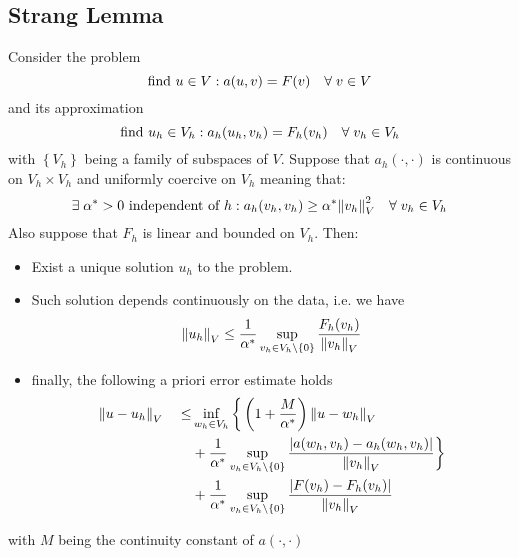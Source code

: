 \subsection{Strang Lemma}
\begin{lemma}
Consider the problem
\begin{equation}
    \text{find } u \in V: a(u,v) = F(v) \quad \forall \; v \in V
    \label{another_weak_formulation}
\end{equation}
and its approximation 
\begin{equation}
    \text{find } u_h \in V_h: a_h(u_h,v_h) = F_h(v_h) \quad \forall \; v_h \in V_h
    \label{another_weak_approximation}
\end{equation}
with \(\left\{V_h\right\}\) being a family of subspaces of \(V\). Suppose that \(a_h(\cdot,\cdot)\) is continuous on \(V_h \times V_h\) and uniformly coercive on \(V_h\) meaning that:
\[
    \exists \; \alpha^* > 0 \text{ independent of }h : a_h(v_h, v_h) \geq \alpha^* \norm{v_h}^2_V \quad \forall \; v_h \in V_h
\]
Also suppose that \(F_h\) is linear and bounded on \(V_h\). Then:
\begin{itemize}
    \item Exist a unique solution \(u_h\) to the problem.
    \item Such solution depends continuously on the data, i.e. we have 
    \[
        \norm{u_h}_V \leq \frac{1}{\alpha^*} \sup_{v_h \in V_h \backslash \left\{0\right\}} \frac{F_h(v_h)}{\norm{v_h}_V}
    \]
    \item  finally, the following a priori error estimate holds 
    \begin{align*}
        \norm{u-u_h}_V \quad \leq & \inf_{w_h \in V_h} \bigg\{\left(1+\frac{M}{\alpha^*}\right) \norm{u-w_h}_V \\
        &+ \frac{1}{\alpha^*} \sup_{v_h \in V_h \backslash \left\{0\right\}} \frac{\abs{a(w_h, v_h) - a_h(w_h, v_h)}}{\norm{v_h}_V} \bigg\} \\
        &+ \frac{1}{\alpha^*} \sup_{v_h \in V_h \backslash \left\{0\right\}} \frac{\abs{F(v_h)-F_h(v_h)}}{\norm{v_h}_V} 
    \end{align*}
\end{itemize}
with \(M\) being the continuity constant of \(a(\cdot, \cdot)\)
\label{strang_lemma_sem}
\end{lemma}
